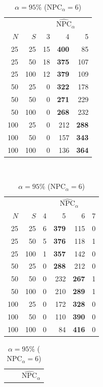 \documentclass{article}
\newcounter{th}
\begin{document}
\begin{table}
\begin{subtable}[h]{0.3\textwidth}
\begin{tabular}{rr|rrr}
    & & \multicolumn{3}{c}{$\widehat{\text{NPC}}_{\alpha}$} \\
    $N$ & $S$ & 3 & 4 & 5 \\
    \hline
    25 & 25 & 15 & \textbf{400} & 85\\
    25 & 50 & 18 & \textbf{375} & 107\\
    25 & 100 & 12 & \textbf{379} & 109\\
    50 & 25 & 0 & \textbf{322} & 178\\
    50 & 50 & 0 & \textbf{271} & 229\\
    50 & 100 & 0 & \textbf{268} & 232\\
    100 & 25 & 0 & 212 & \textbf{288}\\
    100 & 50 & 0 & 157 & \textbf{343}\\
    100 & 100 & 0 & 136 & \textbf{364}\\
\end{tabular}
\caption{$\alpha = 90\%$ ($\text{NPC}_{\alpha} = 5$)}
\end{subtable}
\\
\begin{subtable}[h]{0.45\textwidth}
\centering
\begin{tabular}{rr|rrrr}
    & & \multicolumn{4}{c}{$\widehat{\text{NPC}}_{\alpha}$} \\
    $N$ & $S$ & 4 & 5 & 6 & 7 \\
    \hline
    25 & 25 & 6 & \textbf{379} & 115 & 0\\
    25 & 50 & 5 & \textbf{376} & 118 & 1\\
    25 & 100 & 1 & \textbf{357} & 142 & 0\\
    50 & 25 & 0 & \textbf{288} & 212 & 0\\
    50 & 50 & 0 & 232 & \textbf{267} & 1\\
    50 & 100 & 0 & 210 & \textbf{289} & 1\\
    100 & 25 & 0 & 172 & \textbf{328} & 0\\
    100 & 50 & 0 & 110 & \textbf{390} & 0\\
    100 & 100 & 0 & 84 & \textbf{416} & 0\\
\end{tabular}
\caption{$\alpha = 95\%$ ($\text{NPC}_{\alpha} = 6$)}
\end{subtable}
\hfill
\begin{subtable}[h]{0.45\textwidth}
\centering
\begin{tabular}{rr|rrrr}
    & & \multicolumn{4}{c}{$\widehat{\text{NPC}}_{\alpha}$} \\

\end{tabular}
\end{subtable}
\end{table}
\end{document}
